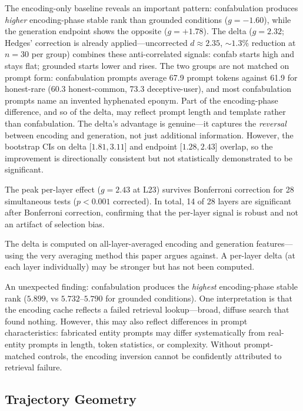 \documentclass[11pt,a4paper]{article}
\begin{document}
The encoding-only baseline reveals an important pattern: confabulation
produces \emph{higher} encoding-phase stable rank than grounded
conditions ($g = -1.60$), while the generation endpoint shows the
opposite ($g = +1.78$). The delta ($g = 2.32$; Hedges' correction is already applied---uncorrected
$d \approx 2.35$, ${\sim}1.3\%$ reduction at $n = 30$ per group) combines
these anti-correlated signals: confab starts high and stays flat; grounded
starts lower and rises.
The two groups are not matched on prompt form: confabulation prompts
average 67.9 prompt tokens against 61.9 for honest-rare (60.3
honest-common, 73.3 deceptive-user), and most confabulation prompts
name an invented hyphenated eponym. Part of the encoding-phase
difference, and so of the delta, may reflect prompt length and template
rather than confabulation.
The delta's advantage is genuine---it captures
the \emph{reversal} between encoding and generation, not just
additional information. However, the bootstrap CIs on delta
[$1.81, 3.11$] and endpoint [$1.28, 2.43$] overlap, so the
improvement is directionally consistent but not statistically
demonstrated to be significant.

The peak per-layer effect ($g = 2.43$ at L23) survives
Bonferroni correction for 28 simultaneous tests ($p < 0.001$
corrected). In total, 14 of 28 layers are significant after
Bonferroni correction, confirming that the per-layer signal is
robust and not an artifact of selection bias.

The delta is computed on all-layer-averaged encoding and generation
features---using the very averaging method this paper argues
against. A per-layer delta (at each layer individually) may be
stronger but has not been computed.

An unexpected finding: confabulation produces the \emph{highest}
encoding-phase stable rank ($5.899$, vs $5.732$--$5.790$ for grounded
conditions). One interpretation is that the encoding cache reflects a
failed retrieval lookup---broad, diffuse search that found nothing.
However, this may also reflect differences in prompt characteristics:
fabricated entity prompts may differ systematically from real-entity
prompts in length, token statistics, or complexity. Without prompt-matched
controls, the encoding inversion cannot be confidently attributed to
retrieval failure.

\subsection{Trajectory Geometry}
\end{document}
